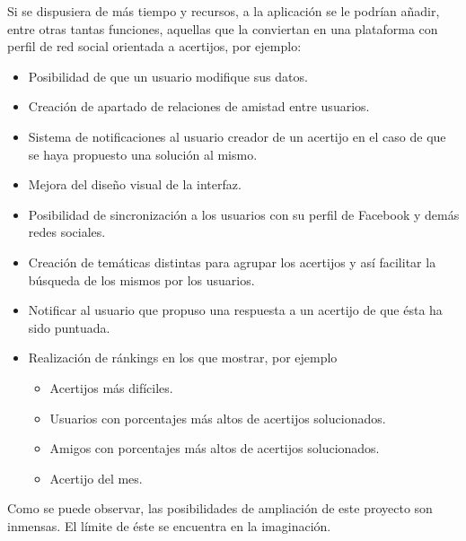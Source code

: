 Si se dispusiera de más tiempo y recursos, a la aplicación se le podrían añadir, entre otras tantas funciones, aquellas que la conviertan en una plataforma con perfil de red social orientada a acertijos, por ejemplo:

\begin{itemize}
    \item Posibilidad de que un usuario modifique sus datos.
    \item Creación de apartado de relaciones de amistad entre usuarios.
    \item Sistema de notificaciones al usuario creador de un acertijo en el caso de que se haya propuesto una solución al mismo.
    \item Mejora del diseño visual de la interfaz.
    \item Posibilidad de sincronización a los usuarios con su perfil de Facebook y demás redes sociales.
    \item Creación de temáticas distintas para agrupar los acertijos y así facilitar la búsqueda de los mismos por los usuarios.
    \item Notificar al usuario que propuso una respuesta a un acertijo de que ésta ha sido puntuada.
    \item Realización de ránkings en los que mostrar, por ejemplo 
        \begin{itemize}
            \item Acertijos más difíciles.
            \item Usuarios con porcentajes más altos de acertijos solucionados.
            \item Amigos con porcentajes más altos de acertijos solucionados.
            \item Acertijo del mes.
        \end{itemize}
\end{itemize}

Como se puede observar, las posibilidades de ampliación de este proyecto son inmensas. El límite de éste se encuentra en la imaginación.